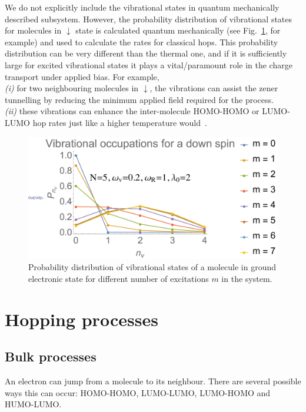 \documentclass[a4paper,twocolumn]{revtex4-1} %
\newcommand{\da}{\downarrow}
\begin{document}
We do not explicitly include the vibrational states in quantum mechanically described subsystem. 
However, the probability distribution of vibrational states for molecules in $\da$ state is calculated quantum mechanically 
(see Fig.~\ref{fig:nv}, for example) and used to calculate the rates for classical hops.
This probability distribution can be very different than the thermal one, and if it is sufficiently large for excited vibrational states it
plays a vital/paramount role in the charge transport under applied bias.
For example, 
\\{\it(i)} for two neighbouring molecules in $\da$, 
the vibrations can assist the zener tunnelling by reducing the 
minimum applied field required for the process.
\\{\it(ii)}
these vibrations can enhance the inter-molecule HOMO-HOMO or LUMO-LUMO 
hop rates just like a higher temperature would~\cite{kudinov96}.


\begin{figure}[htpb]
  \centering
  \includegraphics[width=1\columnwidth]{plot-n5}
  \caption{Probability distribution of vibrational states of a molecule in ground electronic state for different number of excitations $m$ in the system. 
 \label{fig:nv}}  
\end{figure}


\section{Hopping processes}

\subsection{Bulk processes}

An electron can jump from a molecule to its neighbour.
There are several possible ways this can occur: HOMO-HOMO, LUMO-LUMO, LUMO-HOMO and HUMO-LUMO.
\end{document}

